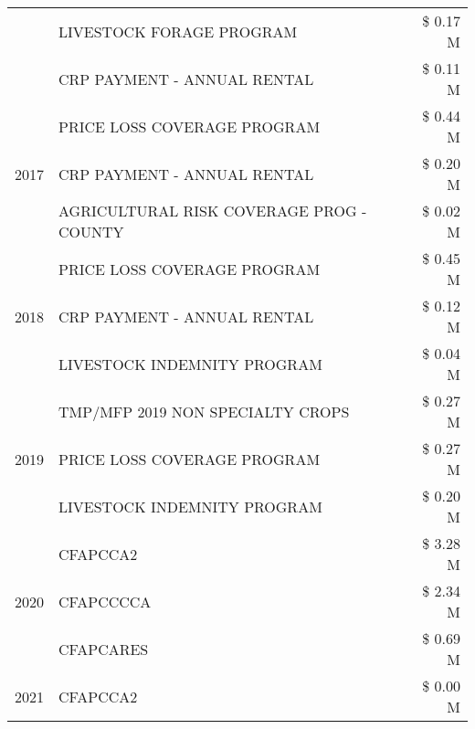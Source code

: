 \begin{tabular}{llr}
 & LIVESTOCK FORAGE PROGRAM & \$ 0.17 M \\
 & CRP PAYMENT - ANNUAL RENTAL & \$ 0.11 M \\
\cline{1-3}
\multirow[t]{3}{*}{2017} & PRICE LOSS COVERAGE PROGRAM & \$ 0.44 M \\
 & CRP PAYMENT - ANNUAL RENTAL & \$ 0.20 M \\
 & AGRICULTURAL RISK COVERAGE PROG - COUNTY & \$ 0.02 M \\
\cline{1-3}
\multirow[t]{3}{*}{2018} & PRICE LOSS COVERAGE PROGRAM & \$ 0.45 M \\
 & CRP PAYMENT - ANNUAL RENTAL & \$ 0.12 M \\
 & LIVESTOCK INDEMNITY PROGRAM & \$ 0.04 M \\
\cline{1-3}
\multirow[t]{3}{*}{2019} & TMP/MFP 2019 NON SPECIALTY CROPS & \$ 0.27 M \\
 & PRICE LOSS COVERAGE PROGRAM & \$ 0.27 M \\
 & LIVESTOCK INDEMNITY PROGRAM & \$ 0.20 M \\
\cline{1-3}
\multirow[t]{3}{*}{2020} & CFAPCCA2 & \$ 3.28 M \\
 & CFAPCCCCA & \$ 2.34 M \\
 & CFAPCARES & \$ 0.69 M \\
\cline{1-3}
2021 & CFAPCCA2 & \$ 0.00 M \\
\cline{1-3}
\bottomrule
\end{tabular}
